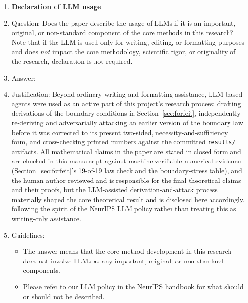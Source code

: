 \begin{enumerate}
\item {\bf Declaration of LLM usage}
    \item[] Question: Does the paper describe the usage of LLMs if it is an important, original, or non-standard component of the core methods in this research? Note that if the LLM is used only for writing, editing, or formatting purposes and does \emph{not} impact the core methodology, scientific rigor, or originality of the research, declaration is not required.
    \item[] Answer: \answerYes{}
    \item[] Justification: Beyond ordinary writing and formatting assistance, LLM-based agents were used as an active part of this project's research process: drafting derivations of the boundary conditions in Section~\ref{sec:forfeit}, independently re-deriving and adversarially attacking an earlier version of the boundary law before it was corrected to its present two-sided, necessity-and-sufficiency form, and cross-checking printed numbers against the committed \texttt{results/} artifacts. All mathematical claims in the paper are stated in closed form and are checked in this manuscript against machine-verifiable numerical evidence (Section~\ref{sec:forfeit}'s 19-of-19 law check and the boundary-stress table), and the human author reviewed and is responsible for the final theoretical claims and their proofs, but the LLM-assisted derivation-and-attack process materially shaped the core theoretical result and is disclosed here accordingly, following the spirit of the NeurIPS LLM policy rather than treating this as writing-only assistance.
    \item[] Guidelines:
    \begin{itemize}
        \item The answer \answerNA{} means that the core method development in this research does not involve LLMs as any important, original, or non-standard components.
        \item Please refer to our LLM policy in the NeurIPS handbook for what should or should not be described.
    \end{itemize}

\end{enumerate}
